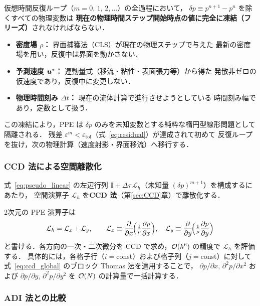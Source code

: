 仮想時間反復ループ（$m = 0,\,1,\,2,\ldots$）の全過程において，
$\delta p \equiv p^{n+1}-p^n$ を除くすべての物理変数は
\textbf{現在の物理時間ステップ開始時点の値に完全に凍結（フリーズ）}されなければならない．
\begin{itemize}
  \item \textbf{密度場 $\rho$：} 界面捕獲法（CLS）が現在の物理ステップで与えた
        最新の密度場を用い，反復中は界面を動かさない．
  \item \textbf{予測速度 $\bm{u}^*$：} 運動量式（移流・粘性・表面張力等）から得た
        発散非ゼロの仮速度であり，反復中に変更しない．
  \item \textbf{物理時間刻み $\Delta t$：} 現在の流体計算で進行させようとしている
        時間刻み幅であり，定数として扱う．
\end{itemize}
この凍結により，PPE は $\delta p$ のみを未知変数とする純粋な楕円型線形問題として隔離される．
残差 $\varepsilon^m < \varepsilon_\mathrm{tol}$（式~\eqref{eq:residual}）が達成されて初めて
反復ループを抜け，次の物理計算（速度射影・界面移流）へ移行する．

\subsubsection{CCD 法による空間離散化}
\label{sec:pseudo_ccd_discretization}

式~\eqref{eq:pseudo_linear} の左辺行列 $\mathbf{I} + \Delta\tau\,\mathcal{L}_h$（未知量 $(\delta p)^{m+1}$）を構成するにあたり，
空間演算子 $\mathcal{L}_h$ を\textbf{CCD 法}（第\ref{sec:CCD}章）で離散化する．

2次元の PPE 演算子は
\begin{equation}
  \mathcal{L}_h = \mathcal{L}_x + \mathcal{L}_y,
  \qquad
  \mathcal{L}_x \equiv \dfrac{\partial }{\partial x}\!\Bigl(\tfrac{1}{\rho}\dfrac{\partial p}{\partial x}\Bigr),\quad
  \mathcal{L}_y \equiv \dfrac{\partial }{\partial y}\!\Bigl(\tfrac{1}{\rho}\dfrac{\partial p}{\partial y}\Bigr)
  \label{eq:L_split}
\end{equation}
と書ける．各方向の一次・二次微分を CCD で求め，$\mathcal{O}(h^6)$ の精度で $\mathcal{L}_h$ を評価する．
具体的には，各格子行（$i=$const）および格子列（$j=$const）に対して
式~\eqref{eq:ccd_global} のブロック Thomas 法を適用することで，
$\partial p/\partial x,\,\partial^2 p/\partial x^2$ および $\partial p/\partial y,\,\partial^2 p/\partial y^2$ を
$\mathcal{O}(N)$ の計算量で一括計算する．

\subsubsection{ADI 法との比較}
\label{sec:pseudo_adi_comparison}

